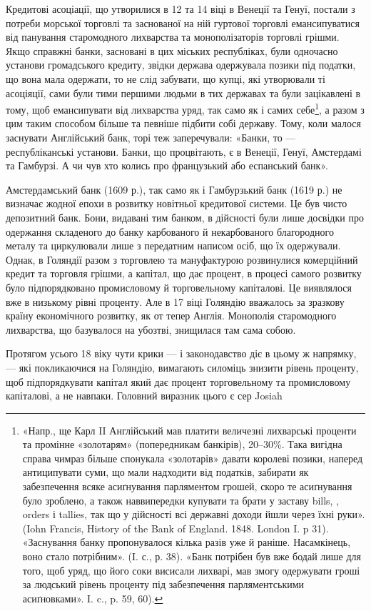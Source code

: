 Кредитові асоціації, що утворилися в 12 та 14 віці в Венеції та Генуї,
постали з потреби морської торговлі та заснованої на ній гуртової торговлі
емансипуватися від панування старомодного лихварства та монополізаторів
торговлі грішми. Якщо справжні банки, засновані в цих міських республіках,
були одночасно установи громадського кредиту, звідки держава одержувала позики
під податки, що вона мала одержати, то не слід забувати, що купці, які утворювали
ті асоціяції, сами були тими першими людьми в тих державах та були
зацікавлені в тому, щоб емансипувати від лихварства уряд, так само як і самих
себе\footnote{
«Напр., ще Карл II Англійський мав платити величезні лихварські проценти та промінне
«золотарям» (попередникам банкірів), 20--30\%. Така вигідна справа чимраз більше спонукала «золотарів»
давати королеві позики, наперед антиципувати суми, що мали надходити від податків, забирати
як забезпечення всяке асиґнування парляментом грошей, скоро те асиґнування було зроблено, а також
наввипередки купувати та брати у заставу bills, , orders і tallies, так що у дійсності всі державні
доходи
йшли через їхні руки». (Iohn Francis, History of the Bank of England. 1848. London I. p 31).
«Заснування
банку пропонувалося кілька разів уже й раніше. Насамкінець, воно стало потрібним». (I. с., р. 38).
«Банк потрібен був вже бодай лише для того, щоб уряд, що його соки висисали лихварі, мав змогу
одержувати гроші за людський рівень проценту під забезпечення парляментськими асиґновками».
I. c., p. 59, 60).
}, а разом з цим таким способом більше та певніше підбити собі державу.
Тому, коли малося заснувати Англійський банк, торі теж заперечували: «Банки,
то — республіканські установи. Банки, що процвітають, є в Венеції, Генуї,
Амстердамі та Гамбурзі. А чи чув хто колись про французький або еспанський
банк».

Амстердамський банк (1609 р.), так само як і Гамбурзький банк (1619 р.)
не визначає жодної епохи в розвитку новітньої кредитової системи. Це був
чисто депозитний банк. Бони, видавані тим банком, в дійсності були лише
досвідки про одержання складеного до банку карбованого й некарбованого благородного
металу та циркулювали лише з передатним написом осіб, що їх одержували.
Однак, в Голяндії разом з торговлею та мануфактурою розвинулися
комерційний кредит та торговля грішми, а капітал, що дає процент, в процесі
самого розвитку було підпорядковано промисловому й торговельному капіталові.
Це виявлялося вже в низькому рівні проценту. Але в 17 віці Голяндію вважалось
за зразкову країну економічного розвитку, як от тепер Англія. Монополія
старомодного лихварства, що базувалося на убозтві, знищилася там сама собою.

Протягом усього 18 віку чути крики — і законодавство діє в цьому ж напрямку,
— які покликаючися на Голяндію, вимагають силоміць знизити рівень
проценту, щоб підпорядкувати капітал який дає процент торговельному та
промисловому капіталові, а не навпаки. Головний виразник цього є сер Josiah
\parbreak{}  %
